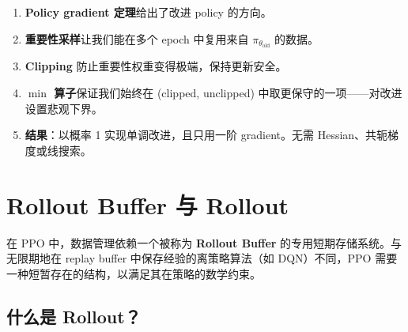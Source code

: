 \begin{intuitionbox}[小结：它为何有效]
\begin{enumerate}
  \item \textbf{Policy gradient 定理}给出了改进 policy 的方向。
  \item \textbf{重要性采样}让我们能在多个 epoch 中复用来自 $\pi_{\theta_{\text{old}}}$ 的数据。
  \item \textbf{Clipping} 防止重要性权重变得极端，保持更新安全。
  \item \textbf{$\min$ 算子}保证我们始终在 (clipped, unclipped) 中取更保守的一项——对改进设置悲观下界。
  \item \textbf{结果}：以概率 1 实现单调改进，且只用一阶 gradient。无需 Hessian、共轭梯度或线搜索。
\end{enumerate}
\end{intuitionbox}

\section{Rollout Buffer 与 Rollout}
\label{rollout-buffer-and-rollouts}

在 PPO 中，数据管理依赖一个被称为 \textbf{Rollout Buffer} 的专用短期存储系统。与无限期地在 replay buffer 中保存经验的离策略算法（如 DQN）不同，PPO 需要一种短暂存在的结构，以满足其在策略的数学约束。

\subsection{什么是 Rollout？}
\label{what-is-a-rollout}

